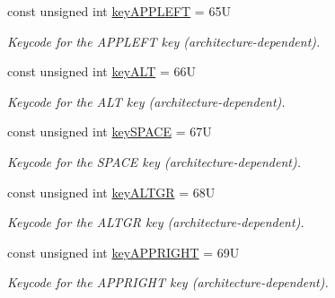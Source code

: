 \begin{DoxyCompactItemize}
const unsigned int \hyperlink{namespacecimg__library__suffixed_1_1cimg_a0312c17281c7581c881b0f080e1c9541}{key\+A\+P\+P\+L\+E\+FT} = 65U
\begin{DoxyCompactList}\small\item\em Keycode for the {\ttfamily A\+P\+P\+L\+E\+FT} key (architecture-\/dependent). \end{DoxyCompactList}\item 
\mbox{\label{namespacecimg__library__suffixed_1_1cimg_a03acf2d88ae9e67a4fce0c9c174f033b}} 
const unsigned int \hyperlink{namespacecimg__library__suffixed_1_1cimg_a03acf2d88ae9e67a4fce0c9c174f033b}{key\+A\+LT} = 66U
\begin{DoxyCompactList}\small\item\em Keycode for the {\ttfamily A\+LT} key (architecture-\/dependent). \end{DoxyCompactList}\item 
\mbox{\label{namespacecimg__library__suffixed_1_1cimg_a952195fc1929214c0570e2125f48d3b4}} 
const unsigned int \hyperlink{namespacecimg__library__suffixed_1_1cimg_a952195fc1929214c0570e2125f48d3b4}{key\+S\+P\+A\+CE} = 67U
\begin{DoxyCompactList}\small\item\em Keycode for the {\ttfamily S\+P\+A\+CE} key (architecture-\/dependent). \end{DoxyCompactList}\item 
\mbox{\label{namespacecimg__library__suffixed_1_1cimg_a9e0b1cc4e74fce2e975f6a1fb482e294}} 
const unsigned int \hyperlink{namespacecimg__library__suffixed_1_1cimg_a9e0b1cc4e74fce2e975f6a1fb482e294}{key\+A\+L\+T\+GR} = 68U
\begin{DoxyCompactList}\small\item\em Keycode for the {\ttfamily A\+L\+T\+GR} key (architecture-\/dependent). \end{DoxyCompactList}\item 
\mbox{\label{namespacecimg__library__suffixed_1_1cimg_aaa58eba3743dd515b5c1b8c77c9ff023}} 
const unsigned int \hyperlink{namespacecimg__library__suffixed_1_1cimg_aaa58eba3743dd515b5c1b8c77c9ff023}{key\+A\+P\+P\+R\+I\+G\+HT} = 69U
\begin{DoxyCompactList}\small\item\em Keycode for the {\ttfamily A\+P\+P\+R\+I\+G\+HT} key (architecture-\/dependent). \end{DoxyCompactList}\item 

\end{DoxyCompactItemize}
